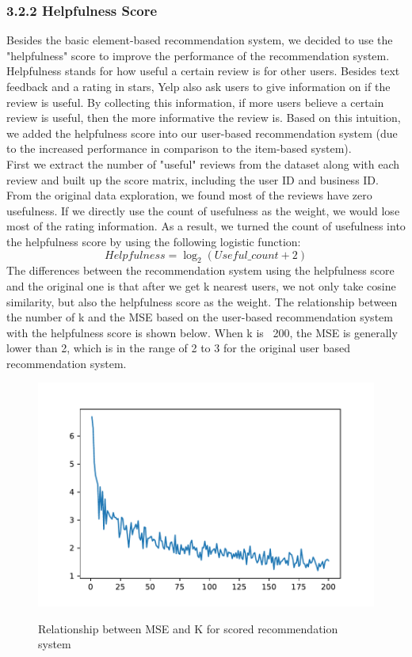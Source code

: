 \documentclass{neu_handout}
\begin{document}
\subsubsection*{3.2.2 Helpfulness Score}
Besides the basic element-based recommendation system, we decided to use the "helpfulness" score to improve the performance of the recommendation system. Helpfulness stands for how useful a certain review is for other users. Besides text feedback and a rating in stars, Yelp also ask users to give information on if the review is useful. By collecting this information, if more users believe a certain review is useful, then the more informative the review is. Based on this intuition, we added the helpfulness score into our user-based recommendation system (due to the increased performance in comparison to the item-based system). 
\\
First we extract the number of "useful" reviews from the dataset along with each review and built up the score matrix, including the user ID and business ID. From the original data exploration, we found most of the reviews have zero usefulness. If we directly use the count of usefulness as the weight, we would lose most of the rating information. As a result, we turned the count of usefulness into the helpfulness score by using the following logistic function:
$$Helpfulness=\log_2(Useful\_count+2)$$
The differences between the recommendation system using the helpfulness score and the original one is that after we get k nearest users, we not only take cosine similarity, but also the helpfulness score as the weight. The relationship between the number of k and the MSE based on the user-based recommendation system with the helpfulness score is shown below. When k is ~200, the MSE is generally lower than 2, which is in the range of 2 to 3 for the original user based recommendation system. 
\begin{figure}[h]
	\centering
	\subfigure
	{
		\includegraphics[width=0.5\linewidth]{mse_k_user_based_scored}
	}
	\caption{Relationship between MSE and K for scored recommendation system}
\end{figure}
\end{document}
